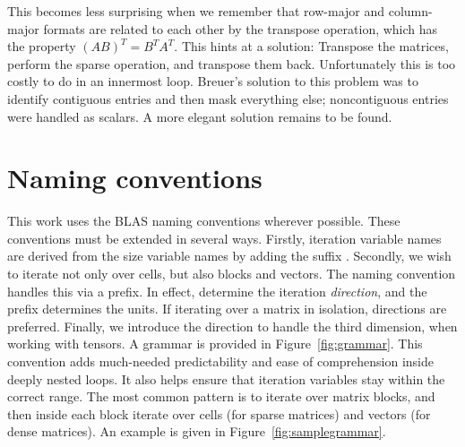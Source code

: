 This becomes less surprising when we remember that row-major and column-major formats are related to each other by the transpose operation, which has the property $(AB)^T = B^T A^T$. This hints at a solution: Transpose the matrices, perform the sparse operation, and transpose them back. Unfortunately this is too costly to do in an innermost loop. Breuer's solution to this problem was to identify contiguous entries and then mask everything else; noncontiguous entries were handled as scalars. A more elegant solution remains to be found.


\section{Naming conventions}

This work uses the BLAS naming conventions wherever possible. These conventions must be extended in several ways. Firstly, iteration variable names are derived from the size variable names by adding the suffix . Secondly, we wish to iterate not only over cells, but also blocks and vectors. The naming convention handles this via a prefix. In effect,  determine the iteration \emph{direction}, and the prefix determines the units. If iterating over a matrix in isolation,  directions are preferred. Finally, we introduce the direction  to handle the third dimension, when working with tensors. A grammar is provided in Figure~\ref{fig:grammar}. This convention adds much-needed predictability and ease of comprehension inside deeply nested loops. It also helps ensure that iteration variables stay within the correct range. The most common pattern is to iterate over matrix blocks, and then inside each block iterate over cells (for sparse matrices) and vectors (for dense matrices). An example is given in Figure~\ref{fig:samplegrammar}. 




